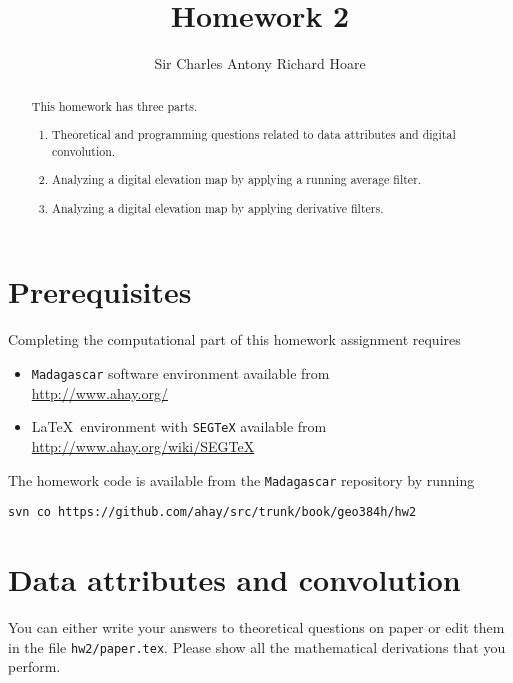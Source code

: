 \author{Sir Charles Antony Richard Hoare}
\title{Homework 2}

\begin{abstract}
  This homework has three parts. 
  \begin{enumerate}
  \item Theoretical and programming questions related to data attributes and digital convolution.  
  \item Analyzing a digital elevation map by applying a running average filter.
  \item Analyzing a digital elevation map by applying derivative filters.
  \end{enumerate}
\end{abstract}

\section{Prerequisites}

Completing the computational part of this homework assignment requires
\begin{itemize}
\item \texttt{Madagascar} software environment available from \\
\url{http://www.ahay.org/}
\item \LaTeX\ environment with \texttt{SEGTeX} available from \\ 
\url{http://www.ahay.org/wiki/SEGTeX}
\end{itemize}

The homework code is available from the \texttt{Madagascar} repository
by running
\begin{verbatim}
svn co https://github.com/ahay/src/trunk/book/geo384h/hw2
\end{verbatim}

\section{Data attributes and convolution}

You can either write your answers to theoretical questions on paper or
edit them in the file \texttt{hw2/paper.tex}. Please show all the
mathematical derivations that you perform.

